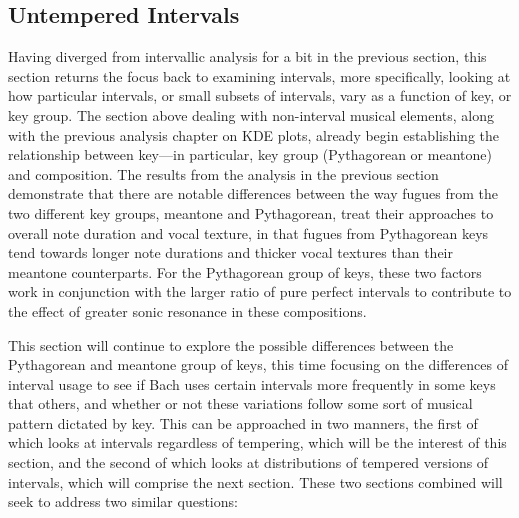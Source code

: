     \subsection{Untempered Intervals}\label{untempered-intervals}

Having diverged from intervallic analysis for a bit in the previous
section, this section returns the focus back to examining intervals,
more specifically, looking at how particular intervals, or small subsets
of intervals, vary as a function of key, or key group. The section above
dealing with non-interval musical elements, along with the previous
analysis chapter on KDE plots, already begin establishing the
relationship between key---in particular, key group (Pythagorean or
meantone) and composition. The results from the analysis in the previous
section demonstrate that there are notable differences between the way
fugues from the two different key groups, meantone and Pythagorean,
treat their approaches to overall note duration and vocal texture, in
that fugues from Pythagorean keys tend towards longer note durations and
thicker vocal textures than their meantone counterparts. For the
Pythagorean group of keys, these two factors work in conjunction with
the larger ratio of pure perfect intervals to contribute to the effect
of greater sonic resonance in these compositions.

This section will continue to explore the possible differences between
the Pythagorean and meantone group of keys, this time focusing on the
differences of interval usage to see if Bach uses certain intervals more
frequently in some keys that others, and whether or not these variations
follow some sort of musical pattern dictated by key. This can be
approached in two manners, the first of which looks at intervals
regardless of tempering, which will be the interest of this section, and
the second of which looks at distributions of tempered versions of
intervals, which will comprise the next section. These two sections
combined will seek to address two similar questions:

